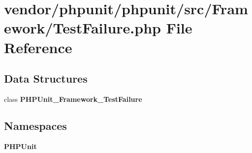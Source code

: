 \section{vendor/phpunit/phpunit/src/\+Framework/\+Test\+Failure.php File Reference}
\label{_test_failure_8php}
\subsection*{Data Structures}
\begin{DoxyCompactItemize}
\item 
class {\bf P\+H\+P\+Unit\+\_\+\+Framework\+\_\+\+Test\+Failure}
\end{DoxyCompactItemize}
\subsection*{Namespaces}
\begin{DoxyCompactItemize}
\item 
 {\bf P\+H\+P\+Unit}
\end{DoxyCompactItemize}
